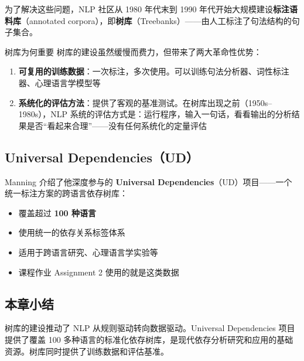 \documentclass[a4paper]{article}
\begin{document}



为了解决这些问题，NLP 社区从 1980 年代末到 1990 年代开始大规模建设\textbf{标注语料库}（annotated corpora），即\textbf{树库}（Treebanks）——由人工标注了句法结构的句子集合。

\begin{knowledgebox}{树库为何重要}
树库的建设虽然缓慢而费力，但带来了两大革命性优势：
\begin{enumerate}
    \item \textbf{可复用的训练数据}：一次标注，多次使用。可以训练句法分析器、词性标注器、心理语言学模型等
    \item \textbf{系统化的评估方法}：提供了客观的基准测试。在树库出现之前（1950s--1980s），NLP 系统的评估方式是：运行程序，输入一句话，看看输出的分析结果是否``看起来合理''——没有任何系统化的定量评估
\end{enumerate}
\end{knowledgebox}

\subsection{Universal Dependencies（UD）}





Manning 介绍了他深度参与的 \textbf{Universal Dependencies}（UD）项目——一个统一标注方案的跨语言依存树库：

\begin{itemize}
    \item 覆盖超过 \textbf{100 种语言}
    \item 使用统一的依存关系标签体系
    \item 适用于跨语言研究、心理语言学实验等
    \item 课程作业 Assignment 2 使用的就是这类数据
\end{itemize}

\subsection{本章小结}

树库的建设推动了 NLP 从规则驱动转向数据驱动。Universal Dependencies 项目提供了覆盖 100 多种语言的标准化依存树库，是现代依存分析研究和应用的基础资源。树库同时提供了训练数据和评估基准。

\end{document}
